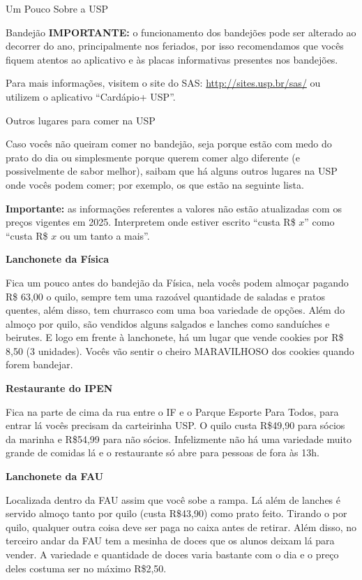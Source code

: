 \begin{secao}{Um Pouco Sobre a USP}
\begin{subsecao}{Bandejão}
\textbf{IMPORTANTE:} o funcionamento dos bandejões pode ser alterado ao decorrer do ano,
principalmente nos feriados, por isso recomendamos que vocês fiquem atentos ao 
aplicativo e às placas informativas presentes nos bandejões.

Para mais informações, visitem o site do SAS: \url{http://sites.usp.br/sas/} ou
utilizem o aplicativo ``Cardápio+ USP''.

\end{subsecao}

\begin{subsecao}{Outros lugares para comer na USP}

Caso vocês não queiram comer no bandejão, seja porque estão com medo do
prato do dia ou simplesmente porque querem comer algo diferente (e
possivelmente de sabor melhor), saibam que há alguns outros lugares na USP onde
vocês podem comer; por exemplo, os que estão na seguinte lista.

\textbf{Importante:} as informações referentes a valores não estão atualizadas com
os preços vigentes em 2025. Interpretem onde estiver escrito ``custa R\$ $x$'' 
como ``custa R\$ $x$ ou um tanto a mais''.

\textbf{Lanchonete da Física}

Fica um pouco antes do bandejão da Física, nela vocês podem almoçar pagando R\$
63,00 o quilo, sempre tem uma razoável quantidade de saladas e pratos
quentes, além disso, tem churrasco com uma boa variedade de opções.
Além do almoço por quilo, são vendidos alguns salgados e lanches como sanduíches e
beirutes. E logo em frente à lanchonete, há um lugar que vende cookies por R\$
8,50 (3 unidades). Vocês vão sentir o cheiro MARAVILHOSO dos cookies quando forem bandejar.

\textbf{Restaurante do IPEN}

Fica na parte de cima da rua entre o IF e o Parque Esporte Para Todos, para
entrar lá vocês precisam da carteirinha USP. O quilo custa R\$49,90 para sócios da marinha 
e R\$54,99 para não sócios. Infelizmente não há uma variedade muito grande de comidas lá e o
restaurante só abre para pessoas de fora às 13h.

\textbf{Lanchonete da FAU}

Localizada dentro da FAU assim que você sobe a rampa. Lá além de lanches é
servido almoço tanto por quilo (custa R\$43,90) como prato feito. Tirando o por
quilo, qualquer outra coisa deve ser paga no caixa antes de retirar. %
Além disso, no terceiro andar da FAU tem a mesinha de doces que os alunos deixam lá
para vender. A variedade e quantidade de doces varia bastante com o dia e o
preço deles costuma ser no máximo R\$2,50.


\end{subsecao}
\end{secao}
